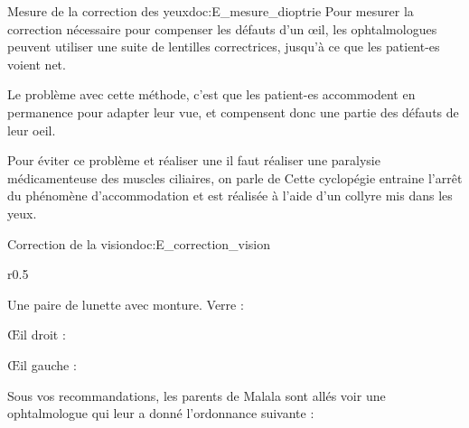 \begin{doc}{Mesure de la correction des yeux}{doc:E_mesure_dioptrie}
  Pour mesurer la correction nécessaire pour compenser les défauts d'un œil, les ophtalmologues peuvent utiliser une suite de lentilles correctrices, jusqu'à ce que les patient-es voient net.

  Le problème avec cette méthode, c'est que les patient-es accommodent en permanence pour adapter leur vue, et compensent donc une partie des défauts de leur oeil. 

  Pour éviter ce problème et réaliser une  il faut réaliser une paralysie médicamenteuse des muscles ciliaires, on parle de 
  Cette cyclopégie entraine l'arrêt du phénomène d'accommodation et est réalisée à l'aide d'un collyre mis dans les yeux.
\end{doc}


\begin{doc}{Correction de la vision}{doc:E_correction_vision}
  \begin{wrapfigure}{r}{0.5\linewidth}
    \vspace*{-34pt}
    \begin{boite}
      Une paire de lunette avec monture. Verre :
      
      \centering
      Œil droit : \hfill {}
      
      Œil gauche : \hfill {}
    \end{boite}
  \end{wrapfigure}
  Sous vos recommandations, les parents de Malala sont allés voir une ophtalmologue qui leur a donné l'ordonnance suivante :  
\end{doc}




